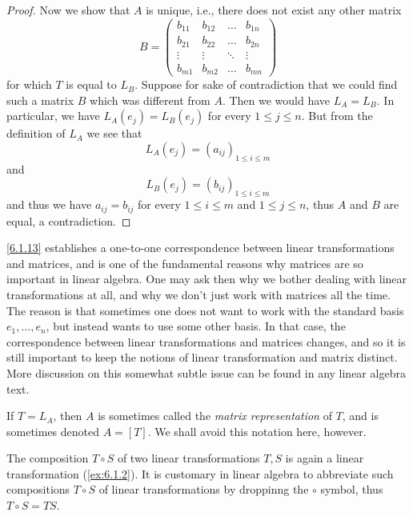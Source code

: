 \begin{proof}
  Now we show that \(A\) is unique, i.e., there does not exist any other matrix
  \[
    B = \begin{pmatrix}
      b_{11} & b_{12} & \dots  & b_{1n} \\
      b_{21} & b_{22} & \dots  & b_{2n} \\
      \vdots & \vdots & \ddots & \vdots \\
      b_{m1} & b_{m2} & \dots  & b_{mn}
    \end{pmatrix}
  \]
  for which \(T\) is equal to \(L_B\).
  Suppose for sake of contradiction that we could find such a matrix \(B\) which was different from \(A\).
  Then we would have \(L_A = L_B\).
  In particular, we have \(L_A(e_j) = L_B(e_j)\) for every \(1 \leq j \leq n\).
  But from the definition of \(L_A\) we see that
  \[
    L_A(e_j) = (a_{ij})_{1 \leq i \leq m}
  \]
  and
  \[
    L_B(e_j) = (b_{ij})_{1 \leq i \leq m}
  \]
  and thus we have \(a_{ij} = b_{ij}\) for every \(1 \leq i \leq m\) and \(1 \leq j \leq n\), thus \(A\) and \(B\) are equal, a contradiction.
\end{proof}

\begin{rmk}\label{6.1.14}
  \cref{6.1.13} establishes a one-to-one correspondence between linear transformations and matrices, and is one of the fundamental reasons why matrices are so important in linear algebra.
  One may ask then why we bother dealing with linear transformations at all, and why we don't just work with matrices all the time.
  The reason is that sometimes one does not want to work with the standard basis \(e_1, \dots, e_n\), but instead wants to use some other basis.
  In that case, the correspondence between linear transformations and matrices changes, and so it is still important to keep the notions of linear transformation and matrix distinct.
  More discussion on this somewhat subtle issue can be found in any linear algebra text.
\end{rmk}

\begin{rmk}\label{6.1.15}
  If \(T = L_A\), then \(A\) is sometimes called the \emph{matrix representation} of \(T\), and is sometimes denoted \(A = [T]\).
  We shall avoid this notation here, however.
\end{rmk}

\begin{note}
  The composition \(T \circ S\) of two linear transformations \(T, S\) is again a linear transformation (\cref{ex:6.1.2}).
  It is customary in linear algebra to abbreviate such compositions \(T \circ S\) of linear transformations by droppinng the \(\circ\) symbol, thus \(T \circ S = TS\).
\end{note}

